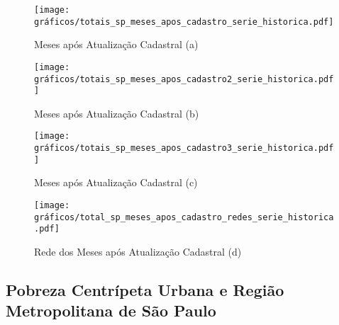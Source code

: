 \documentclass[14pt]{extarticle}
\begin{document}
%
\begin{landscape}
\pagestyle{empty}
\begin{figure}[H]
\centering
	\caption{Meses após Atualização Cadastral (a)}
	\texttt{[image: gráficos/totais\_sp\_meses\_apos\_cadastro\_serie\_historica.pdf]}
	\label{fig:meses_atualiza_cadastro1}
\end{figure}
\end{landscape}


%
\begin{landscape}
\pagestyle{empty}
\begin{figure}[H]
\centering
	\caption{Meses após Atualização Cadastral (b)}
	\texttt{[image: gráficos/totais\_sp\_meses\_apos\_cadastro2\_serie\_historica.pdf]}
	\label{fig:meses_atualiza_cadastro2}
\end{figure}
\end{landscape}


%
\begin{landscape}
\pagestyle{empty}
\begin{figure}[H]
\centering
	\caption{Meses após Atualização Cadastral (c)}
	\texttt{[image: gráficos/totais\_sp\_meses\_apos\_cadastro3\_serie\_historica.pdf]}
	\label{fig:meses_atualiza_cadastro3}
\end{figure}
\end{landscape}


%
\begin{landscape}
\pagestyle{empty}
\begin{figure}[H]
\centering
	\caption{Rede dos Meses após Atualização Cadastral (d)}
	\texttt{[image: gráficos/total\_sp\_meses\_apos\_cadastro\_redes\_serie\_historica.pdf]}
	\label{fig:meses_atualiza_cadastro4}
\end{figure}
\end{landscape}



\subsection{Pobreza Centrípeta Urbana e Região Metropolitana de São Paulo}
\label{pobreza_centripeta}
\end{document}
